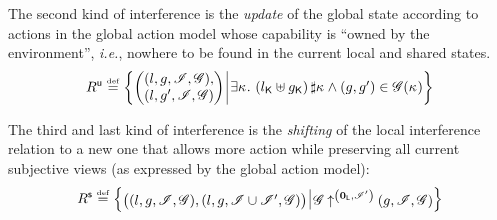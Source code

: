 The second kind of interference is the \emph{update} of the global
state according to actions in the global action model whose capability
is ``owned by the environment'', \textit{i.e.}, nowhere to be found
in the current local and shared states.
\[	
  \updateR \eqdef
  \left\{
  \begin{array}{@{} l @{\hspace*{2pt}} | @{\hspace*{2pt}} r @{}}
    \left(
    \begin{array}{@{} l @{}}
      (l, g, \lmod, \gmod),\\
      (l, g', \lmod, \gmod)
    \end{array}
    \right)
    &
    \begin{array}{@{} l @{} }
      \begin{array}{@{} l @{}}
	\exsts{\ca{} }\left( \capPart{l} \composeCap \capPart{g} \right) \disjoint \ca{} \land 
	(g, g') \in \gmod(\ca{}) \\
      \end{array}	
    \end{array}
  \end{array}
  \right\}
\]	

The third and last kind of interference is the \emph{shifting} of the
local interference relation to a new one that allows more action while
preserving all current subjective views (as expressed by the global
action model):
\[
  \shiftR \eqdef
  \left\{
  \begin{array}{@{} l @{\hspace*{2pt}} | @{\hspace*{2pt}} r @{}}
    \left(
    \begin{array}{@{} l @{}}
      (l, g, \lmod, \gmod),
      \left( l, g, \lmod \cup \lmod', \gmod \right)
    \end{array}
    \right)
    &
    \expandsAM{\gmod}{\unitL}{\lmod'}{g}{\lmod}{\gmod}
  \end{array}
  \right\}
\]


